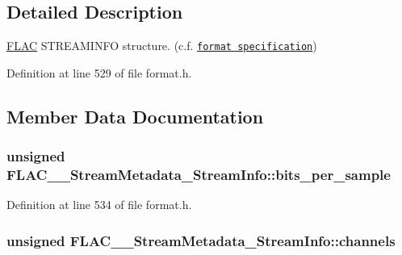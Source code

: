 \subsection{Detailed Description}
\hyperlink{namespace_f_l_a_c}{F\+L\+AC} S\+T\+R\+E\+A\+M\+I\+N\+FO structure. (c.\+f. \href{../format.html#metadata_block_streaminfo}{\tt format specification}) 

Definition at line 529 of file format.\+h.



\subsection{Member Data Documentation}
\subsubsection[{\texorpdfstring{bits\+\_\+per\+\_\+sample}{bits_per_sample}}]{\setlength{\rightskip}{0pt plus 5cm}unsigned F\+L\+A\+C\+\_\+\+\_\+\+Stream\+Metadata\+\_\+\+Stream\+Info\+::bits\+\_\+per\+\_\+sample}\hypertarget{struct_f_l_a_c_____stream_metadata___stream_info_af8886c928641f6dcc242652adf4e1bc9}{}\label{struct_f_l_a_c_____stream_metadata___stream_info_af8886c928641f6dcc242652adf4e1bc9}


Definition at line 534 of file format.\+h.

\subsubsection[{\texorpdfstring{channels}{channels}}]{\setlength{\rightskip}{0pt plus 5cm}unsigned F\+L\+A\+C\+\_\+\+\_\+\+Stream\+Metadata\+\_\+\+Stream\+Info\+::channels}\hypertarget{struct_f_l_a_c_____stream_metadata___stream_info_a13bf6f8e5bdaa2dff48c29c7aff4ef88}{}\label{struct_f_l_a_c_____stream_metadata___stream_info_a13bf6f8e5bdaa2dff48c29c7aff4ef88}


